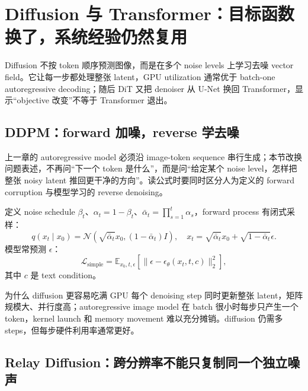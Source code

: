 \section{Diffusion 与 Transformer：目标函数换了，系统经验仍然复用}

Diffusion 不按 token 顺序预测图像，而是在多个 noise levels 上学习去噪 vector field。它让每一步都处理整张 latent，GPU utilization 通常优于 batch-one autoregressive decoding；随后 DiT 又把 denoiser 从 U-Net 换回 Transformer，显示“objective 改变”不等于 Transformer 退出。

\subsection{DDPM：forward 加噪，reverse 学去噪}

上一章的 autoregressive model 必须沿 image-token sequence 串行生成；本节改换问题表述，不再问“下一个 token 是什么”，而是问“给定某个 noise level，怎样把整张 noisy latent 推回更干净的方向”。读公式时要同时区分人为定义的 forward corruption 与模型学习的 reverse denoising。

定义 noise schedule $\beta_t$、$\alpha_t=1-\beta_t$、$\bar\alpha_t=\prod_{s=1}^{t}\alpha_s$，forward process 有闭式采样：
\[
q(x_t\mid x_0)=\mathcal{N}\!\left(\sqrt{\bar\alpha_t}x_0,(1-\bar\alpha_t)I\right),
\quad
x_t=\sqrt{\bar\alpha_t}x_0+\sqrt{1-\bar\alpha_t}\epsilon.
\]
模型常预测 $\epsilon$：
\[
\mathcal{L}_{\text{simple}}=\mathbb{E}_{x_0,t,\epsilon}
\left[\|\epsilon-\epsilon_\theta(x_t,t,c)\|_2^2\right],
\]
其中 $c$ 是 text condition。


\begin{knowledgebox}{为什么 diffusion 更容易吃满 GPU}
每个 denoising step 同时更新整张 latent，矩阵规模大、并行度高；autoregressive image model 在 batch 很小时每步只产生一个 token，kernel launch 和 memory movement 难以充分摊销。diffusion 仍需多 steps，但每步硬件利用率通常更好。
\end{knowledgebox}


\subsection{Relay Diffusion：跨分辨率不能只复制同一个独立噪声}

